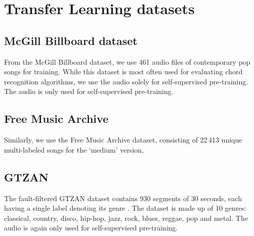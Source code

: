 

\section{Transfer Learning datasets}
\subsection{McGill Billboard dataset}
From the McGill Billboard dataset, we use 461 audio files of contemporary pop songs for training.
While this dataset is most often used for evaluating chord recognition algorithms, we use the audio solely for self-supervised pre-training. The audio is only used for self-supervised pre-training.

\subsection{Free Music Archive}
Similarly, we use the Free Music Archive dataset, consisting of 22\,413 unique multi-labeled songs for the `medium' version, 

\subsection{GTZAN}
The fault-filtered GTZAN dataset contains 930 segments of 30 seconds, each having a single label denoting its genre \cite{Sturm2015, tzanetakis2002musical}. The dataset is made up of 10 genres: classical, country, disco, hip-hop, jazz, rock, blues, reggae, pop and metal. The audio is again only used for self-supervised pre-training.

